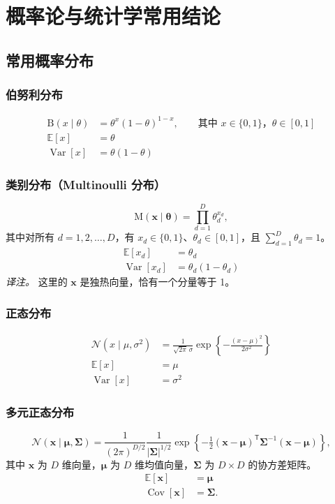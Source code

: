 \chapter{概率论与统计学常用结论}
\label{app:probability}

\section{常用概率分布}
\subsection{伯努利分布}
\[
\begin{aligned}
\mathrm{B}(x\mid\theta)&=\theta^x(1-\theta)^{1-x},
  \qquad \text{其中 }x\in\{0,1\}\text{，}\theta\in[0,1]\\
\mathbb{E}[x]&=\theta\\
\operatorname{Var}[x]&=\theta(1-\theta)
\end{aligned}
\]

\subsection{类别分布（Multinoulli 分布）}
\[
\mathrm{M}(\mathbf{x}\mid\boldsymbol{\theta})=\prod_{d=1}^D\theta_d^{x_d},
\]
其中对所有 $d=1,2,\ldots,D$，有 $x_d\in\{0,1\}$、$\theta_d\in[0,1]$，且 $\sum_{d=1}^D\theta_d=1$。
\[
\begin{aligned}
\mathbb{E}[x_d]&=\theta_d\\
\operatorname{Var}[x_d]&=\theta_d(1-\theta_d)
\end{aligned}
\]
\emph{译注。} 这里的 $\mathbf{x}$ 是独热向量，恰有一个分量等于 1。

\subsection{正态分布}
\[
\begin{aligned}
\mathcal{N}(x\mid\mu,\sigma^2)
 &=\frac{1}{\sqrt{2\pi}\,\sigma}
   \exp\left\{-\frac{(x-\mu)^2}{2\sigma^2}\right\}\\
\mathbb{E}[x]&=\mu\\
\operatorname{Var}[x]&=\sigma^2
\end{aligned}
\]

\subsection{多元正态分布}
\[
\mathcal{N}(\mathbf{x}\mid\boldsymbol{\mu},\boldsymbol{\Sigma})
=\frac{1}{(2\pi)^{D/2}}\frac{1}{|\boldsymbol{\Sigma}|^{1/2}}
 \exp\left\{-\tfrac12(\mathbf{x}-\boldsymbol{\mu})^{\mathsf T}
 \boldsymbol{\Sigma}^{-1}(\mathbf{x}-\boldsymbol{\mu})\right\},
\]
其中 $\mathbf{x}$ 为 $D$ 维向量，$\boldsymbol{\mu}$ 为 $D$ 维均值向量，$\boldsymbol{\Sigma}$ 为 $D\times D$ 的协方差矩阵。
\[
\begin{aligned}
\mathbb{E}[\mathbf{x}]&=\boldsymbol{\mu}\\
\operatorname{Cov}[\mathbf{x}]&=\boldsymbol{\Sigma}.
\end{aligned}
\]


